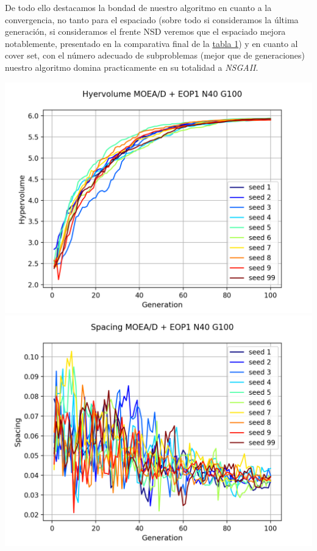 De todo ello destacamos la bondad de nuestro algoritmo en cuanto a la convergencia, no tanto para el espaciado (sobre todo si consideramos la última generación, si consideramos el frente NSD veremos que el espaciado mejora notablemente, presentado en la comparativa final de la \hyperref[table:1]{tabla 1}) y en cuanto al cover set, con el número adecuado de subproblemas (mejor que de generaciones) nuestro algoritmo domina practicamente en su totalidad a \textit{NSGAII}. \\

\begin{center}
\includegraphics[scale=0.43]{figures/METRICS_EOP1/Hypervol_N40_G100.png} \quad 
\includegraphics[scale=0.43]{figures/METRICS_EOP1/Spacing_N40_G100.png}\\
\end{center}

